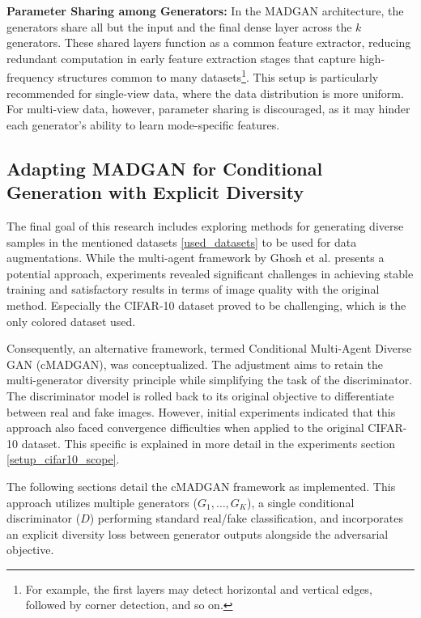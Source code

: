\noindent\textbf{Parameter Sharing among Generators:} In the MADGAN architecture, the generators share all but the input and the final dense layer across the \(k\) generators. These shared layers function as a common feature extractor, reducing redundant computation in early feature extraction stages that capture high-frequency structures common to many datasets\footnote{For example, the first layers may detect horizontal and vertical edges, followed by corner detection, and so on.}. This setup is particularly recommended for single-view data, where the data distribution is more uniform. For multi-view data, however, parameter sharing is discouraged, as it may hinder each generator’s ability to learn mode-specific features.


\newcommand{\definegenerator}{\texttt{define\_generator}}
\newcommand{\definediscriminator}{\texttt{define\_discriminator}}
\newcommand{\lambdadiv}{\lambda_{\text{div}}}
\subsection[Adapting MADGAN for Conditional Generation with Explicit Diversity - cMADGAN]{Adapting MADGAN for Conditional Generation with Explicit Diversity}
\label{theoretical_cmadgan}

The final goal of this research includes exploring methods for generating diverse samples in the mentioned datasets \ref{used_datasets} to be used for data augmentations. While the multi-agent framework by Ghosh et al. presents a potential approach, experiments revealed significant challenges in achieving stable training and satisfactory results in terms of image quality with the original method. Especially the CIFAR-10 dataset proved to be challenging, which is the only colored dataset used.

Consequently, an alternative framework, termed Conditional Multi-Agent Diverse GAN (cMADGAN), was conceptualized. The adjustment aims to retain the multi-generator diversity principle while simplifying the task of the discriminator. The discriminator model is rolled back to its original objective to differentiate between real and fake images. However, initial experiments indicated that this approach also faced convergence difficulties when applied to the original CIFAR-10 dataset. This specific is explained in more detail in the experiments section \ref{setup_cifar10_scope}.

The following sections detail the cMADGAN framework as implemented. This approach utilizes multiple generators ($G_1, \dots, G_K$), a single conditional discriminator ($D$) performing standard real/fake classification, and incorporates an explicit diversity loss between generator outputs alongside the adversarial objective.

